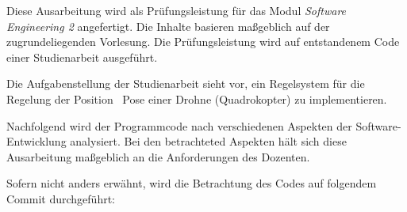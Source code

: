 
Diese Ausarbeitung wird als Prüfungsleistung für das Modul \textit{Software Engineering 2} angefertigt.
Die Inhalte basieren maßgeblich auf der zugrundeliegenden Vorlesung.
Die Prüfungsleistung wird auf entstandenem Code einer Studienarbeit ausgeführt.


Die Aufgabenstellung der Studienarbeit sieht vor, ein Regelsystem für die Regelung der Position \bzw\ Pose einer Drohne (Quadrokopter) zu implementieren.\\


Nachfolgend wird der Programmcode nach verschiedenen Aspekten der Software-Entwicklung analysiert. Bei den betrachteted Aspekten hält sich diese Ausarbeitung maßgeblich an die Anforderungen des Dozenten.

Sofern nicht anders erwähnt, wird die Betrachtung des Codes auf folgendem Commit durchgeführt:
